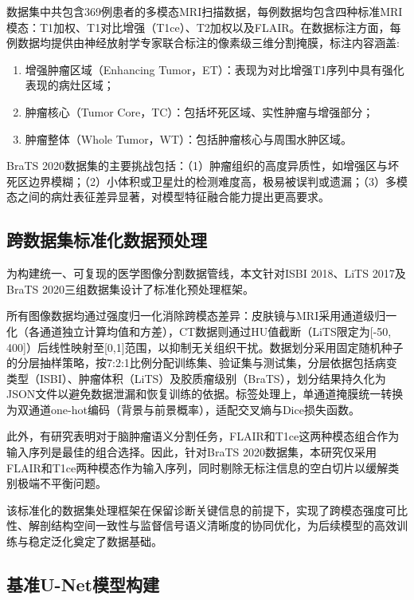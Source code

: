 数据集中共包含369例患者的多模态MRI扫描数据，每例数据均包含四种标准MRI模态：T1加权、T1对比增强（T1ce）、T2加权以及FLAIR。在数据标注方面，每例数据均提供由神经放射学专家联合标注的像素级三维分割掩膜，标注内容涵盖:

\begin{enumerate}
    \item 增强肿瘤区域（Enhancing Tumor，ET）：表现为对比增强T1序列中具有强化表现的病灶区域；
    \item 肿瘤核心（Tumor Core，TC）：包括坏死区域、实性肿瘤与增强部分；
    \item 肿瘤整体（Whole Tumor，WT）：包括肿瘤核心与周围水肿区域。
\end{enumerate}

BraTS 2020数据集的主要挑战包括：（1）肿瘤组织的高度异质性，如增强区与坏死区边界模糊；（2）小体积或卫星灶的检测难度高，极易被误判或遗漏；（3）多模态之间的病灶表征差异显著，对模型特征融合能力提出更高要求。


\subsection{跨数据集标准化数据预处理}

为构建统一、可复现的医学图像分割数据管线，本文针对ISBI 2018、LiTS 2017及BraTS 2020三组数据集设计了标准化预处理框架。

所有图像数据均通过强度归一化消除跨模态差异：皮肤镜与MRI采用通道级归一化（各通道独立计算均值和方差），CT数据则通过HU值截断（LiTS限定为[-50, 400]）后线性映射至[0,1]范围，以抑制无关组织干扰。数据划分采用固定随机种子的分层抽样策略，按7:2:1比例分配训练集、验证集与测试集，分层依据包括病变类型（ISBI）、肿瘤体积（LiTS）及胶质瘤级别（BraTS），划分结果持久化为JSON文件以避免数据泄漏和恢复训练的依据。标签处理上，单通道掩膜统一转换为双通道one-hot编码（背景与前景概率），适配交叉熵与Dice损失函数。  

此外，有研究表明对于脑肿瘤语义分割任务，FLAIR和T1ce这两种模态组合作为输入序列是最佳的组合选择\cite{buchner2023}。因此，针对BraTS 2020数据集，本研究仅采用FLAIR和T1ce两种模态作为输入序列，同时剔除无标注信息的空白切片以缓解类别极端不平衡问题。

该标准化的数据集处理框架在保留诊断关键信息的前提下，实现了跨模态强度可比性、解剖结构空间一致性与监督信号语义清晰度的协同优化，为后续模型的高效训练与稳定泛化奠定了数据基础。

\subsection{基准U-Net模型构建}

